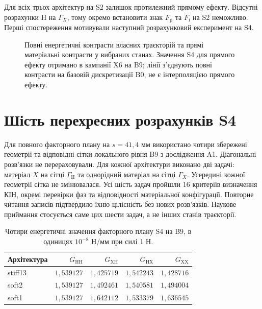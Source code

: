 Для всіх трьох архітектур на S2 залишок протилежний прямому ефекту. Відсутні розрахунки $\mathrm H$ на $\Gamma_X$, тому окремо встановити знак $F_{\mathrm p}$ та $F_{\mathrm i}$ на S2 неможливо. Перші спостереження мотивували наступний розрахунковий експеримент на S4.

\begin{figure}[htbp]
 \centering
 
 \caption{Повні енергетичні контрасти власних траєкторій та прямі матеріальні контрасти у вибраних станах. Значення S4 для прямого ефекту отримано в кампанії X6 на B9; лінії з'єднують повні контрасти на базовій дискретизації B0, не є інтерполяцією прямого ефекту.}
 \label{fig:feedback-direct-total}
\end{figure}

\section{Шість перехресних розрахунків S4}
\label{sec:feedback-x6}

Для повного факторного плану на $s=41{,}4$ мм використано чотири збережені геометрії та відповідні сітки локального рівня B9 з дослідження A1. Діагональні розв'язки не перераховували. Для кожної архітектури виконано дві задачі: матеріал $X$ на сітці $\Gamma_{\mathrm H}$ та однорідний матеріал на сітці $\Gamma_X$. Усередині кожної геометрії сітка не змінювалася. Усі шість задач пройшли 16 критеріїв визначення КІН, окремі перевірки фаз та відповідності матеріальної конфігурації. Повторне читання записів підтвердило їхню цілісність без нових розв'язків. Наукове приймання стосується саме цих шести задач, а не інших станів траєкторії.

\begin{table}[htbp]
 \centering
 \caption{Чотири енергетичні значення факторного плану S4 на B9, в одиницях $10^{-8}$ Н/мм при силі 1 Н.}
 \label{tab:feedback-cross}
 \begin{tabular}{lrrrr}
 \toprule
 Архітектура & $G_{\mathrm{HH}}$ & $G_{\mathrm{XH}}$ & $G_{\mathrm{HX}}$ & $G_{\mathrm{XX}}$\\
 \midrule
stiff13 & $1,539127$ & $1,425719$ & $1,542243$ & $1,428716$ \\
soft2 & $1,539127$ & $1,492461$ & $1,540581$ & $1,494004$ \\
soft1 & $1,539127$ & $1,642112$ & $1,533379$ & $1,636545$ \\

 \bottomrule
 \end{tabular}
\end{table}

